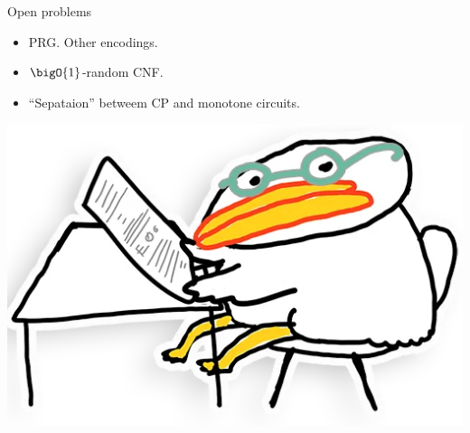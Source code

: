 \begin{frame}{Open problems}

    \begin{itemize}
        \item PRG. Other encodings.
        \item $\bigO{1}$-random CNF.
        \item ``Sepataion'' betweem CP and monotone circuits.
    \end{itemize}

    \vspace{1cm}
    \centering
    \includegraphics[scale = 0.1]{pics/utia-think.png}
\end{frame}